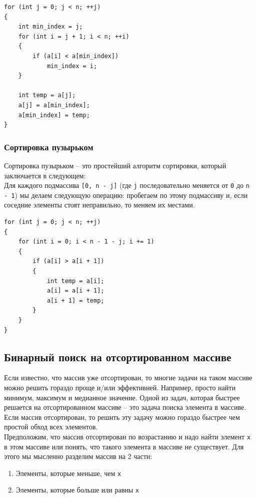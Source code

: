 \documentclass[10pt]{article}
\begin{document}
\begin{lstlisting}
for (int j = 0; j < n; ++j)
{
    int min_index = j;
    for (int i = j + 1; i < n; ++i)
    {
        if (a[i] < a[min_index])
            min_index = i;
    }

    int temp = a[j];
    a[j] = a[min_index];
    a[min_index] = temp;
}
\end{lstlisting}

\subsubsection*{Сортировка пузырьком} 
Сортировка пузырьком -- это простейший алгоритм сортировки, который заключается в следующем: \\
Для каждого подмассива \texttt{[0, n - j]} (где \texttt{j} последовательно меняется от \texttt{0} до \texttt{n - 1}) мы делаем следующую операцию: пробегаем по этому подмассиву и, если соседние элементы стоят неправильно, то меняем их местами.


\begin{lstlisting}
for (int j = 0; j < n; ++j)
{
    for (int i = 0; i < n - 1 - j; i += 1)
    {
        if (a[i] > a[i + 1])
        {
            int temp = a[i];
            a[i] = a[i + 1];
            a[i + 1] = temp;
        }
    }
}
\end{lstlisting}


\subsection*{Бинарный поиск на отсортированном массиве}
Если известно, что массив уже отсортирован, то многие задачи на таком массиве можно решить гораздо проще и/или эффективней. Например, просто найти минимум, максимум и медианное значение. Одной из задач, которая быстрее решается на отсортированном массиве -- это задача поиска элемента в массиве. Если массив отсортирован, то решить эту задачу можно гораздо быстрее чем простой обход всех элементов. \\

Предположим, что массив отсортирован по возрастанию и надо найти элемент \texttt{x} в этом массиве или понять, что такого элемента в массиве не существует. Для этого мы мысленно разделим массив на  2 части:
\begin{enumerate}
\item Элементы, которые меньше, чем \texttt{x}
\item Элементы, которые больше или равны \texttt{x}
\end{enumerate}
\end{document}
